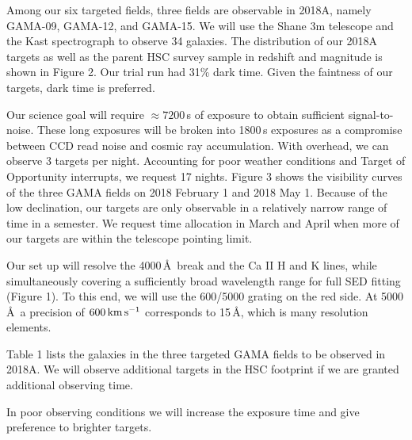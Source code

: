 \documentclass[letterpaper,12pt]{article}
\begin{document}
Among our six targeted fields, three fields are observable in 2018A, namely GAMA-09, GAMA-12, and GAMA-15. We will use
the Shane 3m telescope and the Kast spectrograph to observe 34 galaxies. The distribution of our 2018A targets as well
as the parent HSC survey sample in redshift and magnitude is shown in Figure 2. Our trial run had 31\% dark time. Given
the faintness of our targets, dark time is preferred.

Our science goal will require $\approx7200$\,s of exposure to obtain sufficient signal-to-noise. These long exposures
will be broken into 1800\,s exposures as a compromise between CCD read noise and cosmic ray accumulation. With
overhead, we can observe 3 targets per night. Accounting for poor weather conditions and Target of Opportunity
interrupts, we request 17 nights. Figure 3 shows the visibility curves of the three GAMA fields on 2018 February 1 and
2018 May 1. Because of the low declination, our targets are only observable in a relatively narrow range of time in a
semester. We request time allocation in March and April when more of our targets are within the telescope pointing
limit.

Our set up will resolve the 4000\,\AA\ break and the Ca II H and K lines, while simultaneously covering a sufficiently
broad wavelength range for full SED fitting (Figure 1). To this end, we will use the 600/5000 grating on the red side.
At 5000\,\AA\, a precision of $600\,{\rm km\,s^{-1}}$ corresponds to 15\,\AA, which is many resolution elements.

Table 1 lists the galaxies in the three targeted GAMA fields to be observed in 2018A. We will observe additional
targets in the HSC footprint if we are granted additional observing time.

In poor observing conditions we will increase the exposure time and give preference to brighter targets. 
\end{document}
